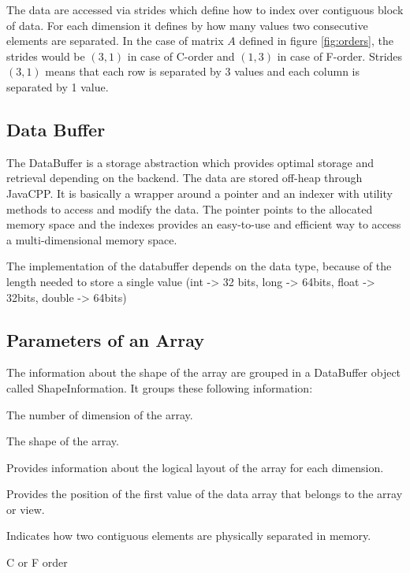 The data are accessed via strides which define how to index over contiguous block of data. For each dimension it defines by how many values two consecutive elements are separated. In the case of matrix $A$ defined in figure \ref{fig:orders}, the strides would be $(3, 1)$ in case of C-order and $(1, 3)$ in case of F-order. Strides $(3, 1)$ means that each row is separated by 3 values and each column is separated by 1 value.

\subsection{Data Buffer}
The DataBuffer is a storage abstraction which provides optimal storage and retrieval depending on the backend. The data are stored off-heap through JavaCPP. It is basically a wrapper around a pointer and an indexer with utility methods to access and modify the data. 
The pointer points to the allocated memory space and the indexes provides an easy-to-use and efficient way to access a multi-dimensional memory space.

The implementation of the databuffer depends on the data type, because of the length needed to store a single value (int -> 32 bits, long -> 64bits, float -> 32bits, double -> 64bits)

\subsection{Parameters of an Array}
The information about the shape of the array are grouped in a DataBuffer object called ShapeInformation. It groups these following information:

\begin{description}[leftmargin=!,labelwidth=\widthof{\bfseries elementWiseStride}]
	\item [Rank] The number of dimension of the array.
	\item [Shape] The shape of the array.
	\item [Strides] Provides information about the logical layout of the array for each dimension.
	\item [Offset] Provides the position of the first value of the data array that belongs to the array or view.
	\item[ElementWiseStride] Indicates how two contiguous elements are physically separated in memory.
	\item[Order] C or F order
\end{description}


